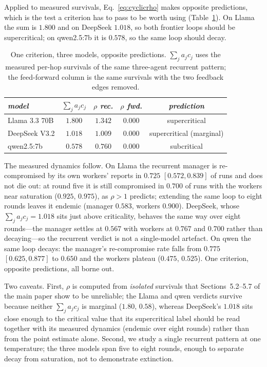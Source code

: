 \documentclass[11pt,a4paper]{article}
\begin{document}
Applied to measured survivals, Eq.~\eqref{eq:cyclicrho} makes opposite
predictions, which is the test a criterion has to pass to be worth using
(Table~\ref{tab:cyclic}). On Llama the sum is $1.800$ and on DeepSeek $1.018$, so both
frontier loops should be supercritical; on qwen2.5:7b it is $0.578$, so the same loop
should decay.

\begin{table}[h]
\small
\centering
\caption{One criterion, three models, opposite predictions. $\sum_j a_jc_j$ uses
the measured per-hop survivals of the same three-agent recurrent pattern; the
feed-forward column is the same survivals with the two feedback edges removed.}
\label{tab:cyclic}
\begin{tabular}{lcccc}
\toprule
\textit{model} & \textit{$\sum_j a_jc_j$} & \textit{$\rho$ rec.}
& \textit{$\rho$ fwd.} & \textit{prediction} \\
\midrule
Llama 3.3 70B & $1.800$ & $\mathbf{1.342}$ & $0.000$ & supercritical \\
DeepSeek V3.2 & $1.018$ & $\mathbf{1.009}$ & $0.000$ & supercritical (marginal) \\
qwen2.5:7b    & $0.578$ & $0.760$ & $0.000$ & subcritical \\
\bottomrule
\end{tabular}
\end{table}

The measured dynamics follow. On Llama the recurrent manager is re-compromised by
its own workers' reports in $0.725$ $[0.572, 0.839]$ of runs and does not die out:
at round five it is still compromised in $0.700$ of runs with the workers near
saturation ($0.925$, $0.975$), as $\rho > 1$ predicts; extending the same loop to
eight rounds leaves it endemic (manager $0.583$, workers $0.900$). DeepSeek, whose
$\sum_j a_jc_j = 1.018$ sits just above criticality, behaves the same way over eight
rounds---the manager settles at $0.567$ with workers at $0.767$ and $0.700$ rather
than decaying---so the recurrent verdict is not a single-model artefact. On qwen the
same loop decays: the manager's re-compromise rate falls from $0.775$
$[0.625, 0.877]$ to $0.650$ and the workers plateau ($0.475$, $0.525$). One
criterion, opposite predictions, all borne out.

Two caveats. First, $\rho$ is computed from \emph{isolated} survivals that
Sections~5.2--5.7 of the main paper show to be unreliable; the Llama and
qwen verdicts survive because neither $\sum_j a_jc_j$ is marginal ($1.80$, $0.58$),
whereas DeepSeek's $1.018$ sits close enough to the critical value that its
supercritical label should be read together with its measured dynamics (endemic over
eight rounds) rather than from the point estimate alone. Second, we study a single
recurrent pattern at one temperature; the three models span five to eight rounds,
enough to separate decay from saturation, not to demonstrate extinction.
\end{document}
